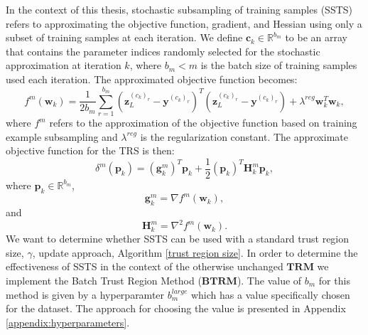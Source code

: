 \documentclass[letterpaper,12pt,titlepage,oneside,final]{book}
\begin{document}
	In the context of this thesis, stochastic subsampling of training samples (SSTS) refers to approximating the objective function, gradient, and Hessian using only a subset of training samples at each iteration. We define $\mathbf{c}_{k} \in \mathbb{R}^{b_{m}}$ to be an array that contains the parameter indices randomly selected for the stochastic approximation at iteration $k$, where $b_{m} < m$ is the batch size of training samples used each iteration. The approximated objective function becomes:
	\begin{equation}
	f^{m}(\mathbf{w}_k) = \frac{1}{2b_{m}}\sum_{r=1}^{b_{m}}{(\mathbf{z}_{L}^{(c_{k})_{r}} - \mathbf{y}^{(c_{k})_{r}})^{T}(\mathbf{z}_{L}^{(c_{k})_{r}} - \mathbf{y}^{(c_{k})_{r}})} + \lambda^{reg}\mathbf{w}_{k}^{T}\mathbf{w}_{k},
	\end{equation}
	where $f^{m}$ refers to the approximation of the objective function based on training example subsampling and $\lambda^{reg}$ is the regularization constant. The approximate objective function for the TRS is then:
	\begin{equation}
	\delta^{m}(\mathbf{p}_{k}) = (\mathbf{g}_{k}^{m})^{T}\mathbf{p}_{k} + \frac{1}{2}(\mathbf{p}_{k})^{T}\mathbf{H}_{k}^{m}\mathbf{p}_{k},
	\end{equation}
	where $\mathbf{p}_{k} \in \mathbb{R}^{b_{m}}$, 
	\begin{equation}
	\mathbf{g}_{k}^{m} = \nabla f^{m}(\mathbf{w}_{k}),
	\end{equation}
	and
	\begin{equation}
	\mathbf{H}_{k}^{m} = \nabla^{2} f^{m}(\mathbf{w}_{k}).
	\end{equation}
	We want to determine whether SSTS can be used with a standard trust region size, $\gamma$, update approach, Algorithm \ref{trust region size}. In order to determine the effectiveness of SSTS in the context of the otherwise unchanged $\mathbf{TRM}$ we implement the Batch Trust Region Method ($\mathbf{BTRM}$). The value of $b_{m}$ for this method is given by a hyperparamter $b_{m}^{large}$ which has a value specifically chosen for the dataset. The approach for choosing the value is presented in Appendix \ref{appendix:hyperparameters}.
	
\end{document}
